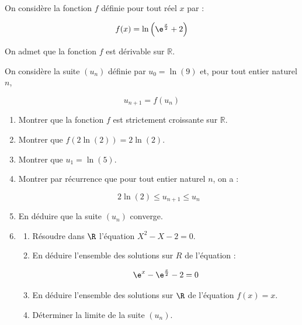 On considère la fonction $f$ définie pour tout réel $x$ par :

\[ f(x) = \ln \left(\e^{\frac{x}{2}} + 2\right) \]

On admet que la fonction $f$ est dérivable sur $\mathbb{R}$.

On considère la suite $(u_{n})$ définie par $u_{0} = \ln (9)$ et, pour tout entier naturel $n$,

\[ u_{n+1} = f(u_{n}) \]

\smallskip

\begin{enumerate}
\item Montrer que la fonction $f$ est strictement croissante sur $\mathbb{R}$.
\item Montrer que $f(2\ln (2)) = 2\ln (2)$.
\item Montrer que $u_{1} = \ln (5)$.
\item Montrer par récurrence que pour tout entier naturel $n$, on a :

\[2\ln(2) \leqslant u_{n+1} \leqslant u_{n}\]

\item En déduire que la suite $(u_{n})$ converge.

\item
	\begin{enumerate}
		\item Résoudre dans $\R$ l'équation $X^{2} - X - 2 = 0$.
		\item En déduire l'ensemble des solutions sur $R$ de l'équation :

\[\e^{x} - \e^{\frac{x}{2}} - 2 = 0\]

		\item En déduire l'ensemble des solutions sur $\R$ de l'équation $f(x) = x$.
		\item Déterminer la limite de la suite $(u_{n})$.
	\end{enumerate}
\end{enumerate}
